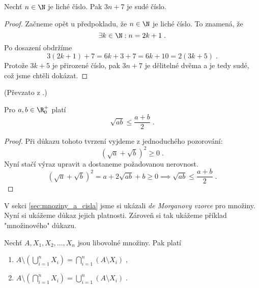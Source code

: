 \begin{assertion}
    Nechť $n\in\N$ je liché číslo. Pak $3n+7$ je sudé číslo.
\end{assertion}
\begin{proof}
    Začneme opět u předpokladu, že $n\in\N$ je liché číslo. To znamená, že
    \begin{equation*}
        \exists k\in\N : n=2k+1\; .
    \end{equation*}
    Po dosazení obdržíme
    \begin{equation*}
        3(2k+1)+7=6k+3+7=6k+10=2(3k+5)\; .
    \end{equation*}
    Protože $3k+5$ je přirozené číslo, pak $3n+7$ je dělitelné dvěma a je tedy sudé, což jsme chtěli dokázat.
\end{proof}
(Převzato z \cite{ChartrandPolimeniZhang2014}.)
\begin{assertion}[AG nerovnost]
    Pro $a,b\in\R_0^+$ platí
    \begin{equation*}
        \sqrt{ab}\leq\dfrac{a+b}{2}\; .
    \end{equation*}
\end{assertion}
\begin{proof}
    Při důkazu tohoto tvrzení vyjdeme z jednoduchého pozorování:
    \begin{equation*}
        (\sqrt{a}+\sqrt{b})^2\geq 0\; .
    \end{equation*}
    Nyní stačí výraz upravit a dostaneme požadovanou nerovnost.
    \begin{equation*}
        (\sqrt{a}+\sqrt{b})^2 = a+2\sqrt{ab}+b\geq 0 \implies \sqrt{ab}\leq \dfrac{a+b}{2}\; .
    \end{equation*}
\end{proof}
V sekci \ref{sec:mnoziny_a_cisla} jsme si ukázali \emph{de Morganovy vzorce} pro množiny. Nyní si ukážeme důkaz jejich platnosti. Zároveň si tak ukážeme příklad "množinového" důkazu.
\begin{assertion}
    Nechť $A,X_1,X_2,\ldots,X_n$ jsou libovolné množiny. Pak platí
    \begin{enumerate}[label=(\roman*)]
        \item\label{item:de_morgan_sets_1} $\displaystyle A \setminus \left(\bigcup\limits_{i=1}^{n}{X_i}\right)=\bigcap\limits_{i=1}^{n}{(A \setminus X_i)}\; ,$
        \item\label{item:de_morgan_sets_2} $\displaystyle A \setminus \left(\bigcap\limits_{i=1}^{n}{X_i}\right)=\bigcup\limits_{i=1}^{n}{(A \setminus X_i)}\; .$
    \end{enumerate}
\end{assertion}
